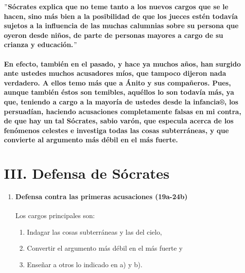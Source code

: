 \begin{multicols}{2}
$"$\textbf{Sócrates explica que no teme tanto a los nuevos cargos que se le hacen, sino más bien a la posibilidad de que los jueces estén todavía sujetos a la influencia de las muchas calumnias sobre su persona que oyeron desde niños, de parte de personas mayores a cargo de su crianza y educación.}$"$ \\\\
\textbf{En efecto, también en el pasado, y hace ya muchos años, han surgido ante ustedes muchos acusadores míos, que tampoco dijeron nada verdadero. A ellos temo más que a Ánito y sus compañeros. Pues, aunque también éstos son temibles, aquéllos lo son todavía más, ya que, teniendo a cargo a la mayoría de ustedes desde la infancia®, los persuadían, haciendo acusaciones completamente falsas en mi contra, de que hay un tal Sócrates, sabio varón, que especula acerca de los fenómenos celestes e investiga todas las cosas subterráneas, y que convierte al argumento más débil en el más fuerte.}


\section*{\center III. Defensa de Sócrates}

    \begin{enumerate}[\bfseries 1.]

	\item \textbf{Defensa contra las primeras acusaciones (19a-24b)}\\\\
	    Los cargos principales son:
	    \begin{enumerate}[\bfseries a.]
		\item Indagar las cosas subterráneas y las del cielo,
		\item Convertir el argumento más débil en el más fuerte y
		\item Enseñar a otros lo indicado en a) y b).
	    \end{enumerate}


\end{enumerate}
\end{multicols}
